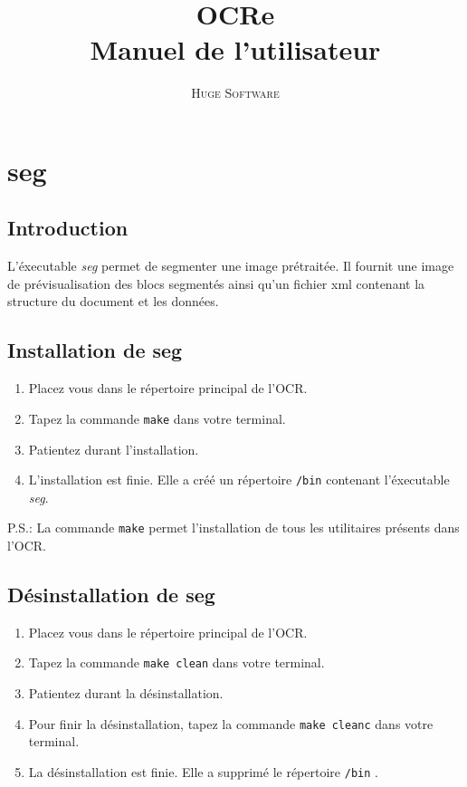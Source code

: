 \documentclass[a4paper,12pt]{report}
\title{OCRe \\ Manuel de l'utilisateur}
\author{\textsc{Huge Software}}
\date{}
\begin{document}
\lstset{language=C}
\dominitoc
\maketitle
\tableofcontents \pagebreak
\thispagestyle{fancy}




\chapter{seg}

\section{Introduction}
  L'éxecutable \emph{seg} permet de segmenter une image
prétraitée. Il fournit une image de prévisualisation
des blocs segmentés ainsi qu'un fichier xml contenant
la structure du document et les données.

\section{Installation de seg}
  \begin{enumerate}
    \item Placez vous dans le répertoire principal de l'OCR.
    \item Tapez la commande \verb!make! dans votre terminal.
    \item Patientez durant l'installation.
    \item L'installation est finie. Elle a créé un répertoire
          \verb!/bin! contenant l'éxecutable \emph{seg}.
  \end{enumerate}
  
P.S.: La commande \verb!make! permet l'installation de tous les
utilitaires présents dans l'OCR.

\section{Désinstallation de seg}
  \begin{enumerate}
    \item Placez vous dans le répertoire principal de l'OCR.
    \item Tapez la commande \verb!make clean! dans votre terminal.
    \item Patientez durant la désinstallation.
    \item Pour finir la désinstallation, tapez la commande
          \verb!make cleanc! dans votre terminal.
    \item La désinstallation est finie. Elle a supprimé le
          répertoire \verb!/bin! .
  \end{enumerate}
\end{document}
